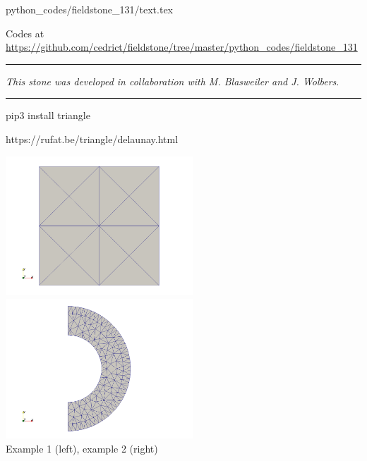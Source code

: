 \begin{flushright} {\tiny {\color{gray} python\_codes/fieldstone\_131/text.tex}} \end{flushright}

%

\begin{center}

Codes at \url{https://github.com/cedrict/fieldstone/tree/master/python_codes/fieldstone_131}
\end{center}

\par\noindent\rule{\textwidth}{0.4pt}

{\sl This stone was developed in collaboration with M. Blasweiler and J. Wolbers}. 

\par\noindent\rule{\textwidth}{0.4pt}


pip3 install triangle

https://rufat.be/triangle/delaunay.html


\begin{center}
\includegraphics[width=7cm]{python_codes/fieldstone_131/example1/example1}
\includegraphics[width=7cm]{python_codes/fieldstone_131/example2/example2}\\
{\captionfont Example 1 (left), example 2 (right)}
\end{center}


